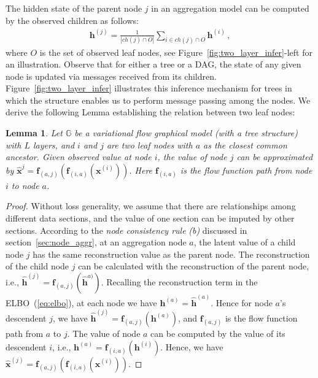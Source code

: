 \documentclass[sigconf, anonymous, review]{acmart}
\theoremstyle{plain}
\newtheorem{lemma}[theorem]{Lemma}
\theoremstyle{definition}
\theoremstyle{remark}
\begin{document}
The hidden state of the parent node $j$ in an  aggregation model can be computed by the observed children as follows:
 \begin{align}\label{eq:aggr_obs_ch}
\mathbf{h}^{(j)}  = \frac{1}{|ch(j) \cap O|}\sum_{i \in ch(j) \cap O} \mathbf{h}^{(i)} \, ,
\end{align}
where $O$ is the set of observed leaf nodes, see Figure~\ref{fig:two_layer_infer}-left for an illustration. 
Observe that for either a tree or a DAG, the state of any given node is updated via messages received from its children. Figure~\ref{fig:two_layer_infer} illustrates this inference mechanism for trees in which the structure enables us to perform message passing among the nodes. 
We derive the following Lemma establishing the relation between two leaf nodes:
\begin{lemma}\label{lm:apprx}
Let $\mathbb{G}$ be a  variational flow graphical model (with a tree structure) with $L$ layers, and $i$ and $j$ are two leaf nodes with $a$ as the closest common ancestor. Given observed value at node $i$, the value of node $j$ can be approximated by   $\widehat{\mathbf{x}}^{j} =  \mathbf{f}_{(a,j)}(\mathbf{f}_{(i, a)}(\mathbf{x}^{(i)}))$. Here $\mathbf{f}_{(i, a)}$ is the flow function path from node $i$ to node $a$. 
\end{lemma}
\begin{proof}
Without loss generality, we assume that there are relationships among different data sections, and the value of one section can be imputed by other sections. 
According to the \emph{node consistency rule} {\it(b)}  discussed in section~\ref{sec:node_aggr}, at an aggregation node  $a$, the latent value of a child node $j$ has the same reconstruction value as the parent node.  
The reconstruction of the child node $j$ can be calculated with the reconstruction of the parent node, i.e., $\widehat{\mathbf{h}}^{(j)} = \mathbf{f}_{(a,j)}(\widehat{\mathbf{h}}^{a)})$. 
Recalling the reconstruction term in the ELBO~(\ref{eq:elbo}), at each node we have $\mathbf{h}^{(a)} = \widehat{\mathbf{h}}^{(a)}$. Hence for node $a$'s descendent $j$, we have $\widehat{\mathbf{h}}^{(j)} = \mathbf{f}_{(a,j)}(\mathbf{h}^{(a)})$, and $\mathbf{f}_{(a,j)}$ is the flow function path from $a$ to $j$. 
The value of node $a$ can be computed by the value of its descendent $i$, i.e., $\mathbf{h}^{(a)} = \mathbf{f}_{(i,a)}(\mathbf{h}^{(i)})$. Hence, we have $\widehat{\mathbf{x}}^{(j)} =  \mathbf{f}_{(a,j)}(\mathbf{f}_{(i, a)}(\mathbf{x}^{(i)}))$.
\end{proof}
\end{document}
